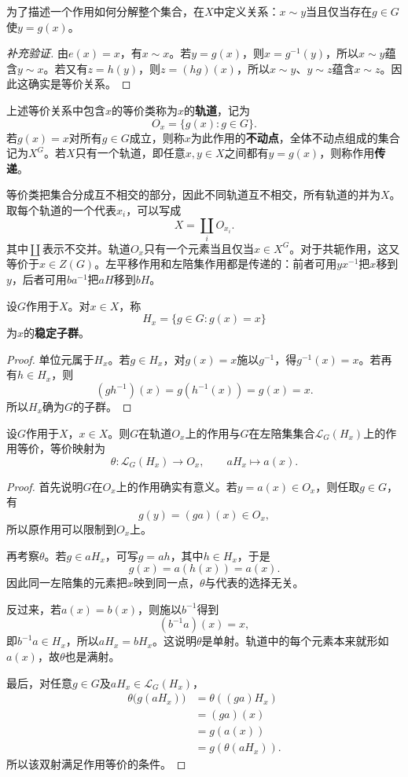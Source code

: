 为了描述一个作用如何分解整个集合，在$X$中定义关系：$x\sim y$当且仅当存在$g\in G$使$y=g(x)$。
\begin{proof}[补充验证]
由$e(x)=x$，有$x\sim x$。若$y=g(x)$，则$x=g^{-1}(y)$，所以$x\sim y$蕴含$y\sim x$。若又有$z=h(y)$，则$z=(hg)(x)$，所以$x\sim y$、$y\sim z$蕴含$x\sim z$。因此这确实是等价关系。
\end{proof}

\begin{definition}
\label{p2:concept:c2-l1031}上述等价关系中包含$x$的等价类称为$x$的\textbf{轨道}，记为
\[
O_x=\{g(x):g\in G\}.
\]
\label{p2:concept:c2-l1035}若$g(x)=x$对所有$g\in G$成立，则称$x$为此作用的\textbf{不动点}，全体不动点组成的集合记为$X^G$。若$X$只有一个轨道，即任意$x,y\in X$之间都有$y=g(x)$，则称作用\textbf{传递}。
\end{definition}

等价类把集合分成互不相交的部分，因此不同轨道互不相交，所有轨道的并为$X$。取每个轨道的一个代表$x_i$，可以写成
\[
X=\coprod_i O_{x_i}.
\]
其中$\coprod$表示不交并。轨道$O_x$只有一个元素当且仅当$x\in X^G$。对于共轭作用，这又等价于$x\in Z(G)$。左平移作用和左陪集作用都是传递的：前者可用$yx^{-1}$把$x$移到$y$，后者可用$ba^{-1}$把$aH$移到$bH$。


\begin{definition}
\label{p2:concept:c2-l1046}设$G$作用于$X$。对$x\in X$，称
\[
H_x=\{g\in G:g(x)=x\}
\]
为$x$的\textbf{稳定子群}。
\end{definition}
\begin{proof}
单位元属于$H_x$。若$g\in H_x$，对$g(x)=x$施以$g^{-1}$，得$g^{-1}(x)=x$。若再有$h\in H_x$，则
\[
(gh^{-1})(x)=g(h^{-1}(x))=g(x)=x.
\]
所以$H_x$确为$G$的子群。
\end{proof}

\begin{theorem}\label{p2:orbit-stabilizer}
设$G$作用于$X$，$x\in X$。则$G$在轨道$O_x$上的作用与$G$在左陪集集合$\mathcal L_G(H_x)$上的作用等价，等价映射为
\[
\theta:\mathcal L_G(H_x)\longrightarrow O_x,
\qquad aH_x\longmapsto a(x).
\]
\end{theorem}
\begin{proof}
首先说明$G$在$O_x$上的作用确实有意义。若$y=a(x)\in O_x$，则任取$g\in G$，有
\[
g(y)=(ga)(x)\in O_x,
\]
所以原作用可以限制到$O_x$上。

再考察$\theta$。若$g\in aH_x$，可写$g=ah$，其中$h\in H_x$，于是
\[
g(x)=a(h(x))=a(x).
\]
因此同一左陪集的元素把$x$映到同一点，$\theta$与代表的选择无关。

反过来，若$a(x)=b(x)$，则施以$b^{-1}$得到
\[
(b^{-1}a)(x)=x,
\]
即$b^{-1}a\in H_x$，所以$aH_x=bH_x$。这说明$\theta$是单射。轨道中的每个元素本来就形如$a(x)$，故$\theta$也是满射。

最后，对任意$g\in G$及$aH_x\in\mathcal L_G(H_x)$，
\begin{align*}
\theta\bigl(g(aH_x)\bigr)
&=\theta((ga)H_x)\\
&=(ga)(x)\\
&=g(a(x))\\
&=g(\theta(aH_x)).
\end{align*}
所以该双射满足作用等价的条件。
\end{proof}

